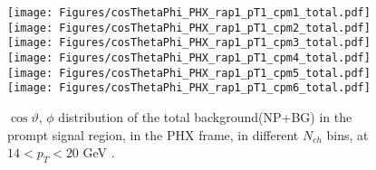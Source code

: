 \documentclass[12pt]{article}
\newcommand{\pt}{$p_{\mathrm{T}}$}
\begin{document}
%
%

\begin{figure}[htbp]
\centering
\texttt{[image: Figures/cosThetaPhi\_PHX\_rap1\_pT1\_cpm1\_total.pdf]}
\texttt{[image: Figures/cosThetaPhi\_PHX\_rap1\_pT1\_cpm2\_total.pdf]}
\texttt{[image: Figures/cosThetaPhi\_PHX\_rap1\_pT1\_cpm3\_total.pdf]}
\texttt{[image: Figures/cosThetaPhi\_PHX\_rap1\_pT1\_cpm4\_total.pdf]}
\texttt{[image: Figures/cosThetaPhi\_PHX\_rap1\_pT1\_cpm5\_total.pdf]}
\texttt{[image: Figures/cosThetaPhi\_PHX\_rap1\_pT1\_cpm6\_total.pdf]}
\caption{$\cos\vartheta,\,\phi$ distribution of the total background(NP+BG) in the prompt signal region, 
	in the PHX frame, in different $N_{ch}$ bins, at $14 < p_{T} < 20$ GeV .}
\end{figure}
\clearpage
\end{document}
